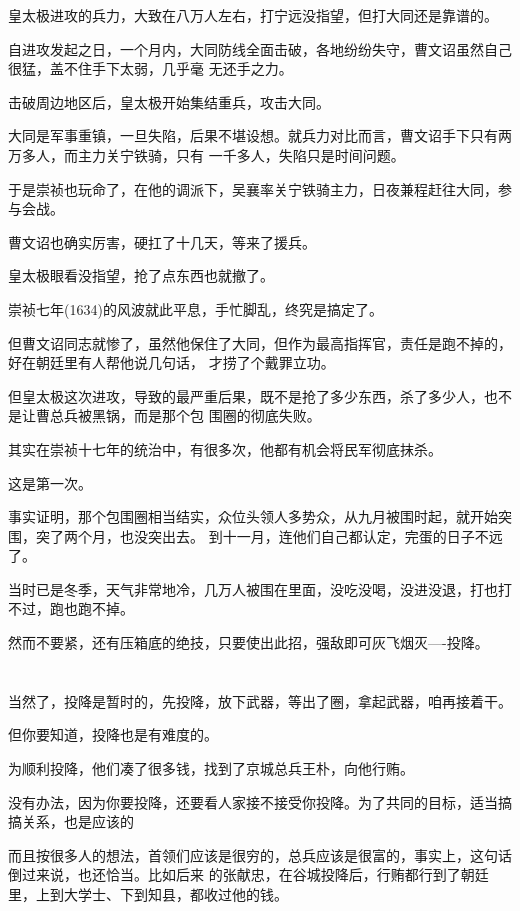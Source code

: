 \documentclass[11pt,a4paper,onecolumn]{article}
\begin{document}
皇太极进攻的兵力，大致在八万人左右，打宁远没指望，但打大同还是靠谱的。

自进攻发起之日，一个月内，大同防线全面击破，各地纷纷失守，曹文诏虽然自己很猛，盖不住手下太弱，几乎毫
无还手之力。

击破周边地区后，皇太极开始集结重兵，攻击大同。

大同是军事重镇，一旦失陷，后果不堪设想。就兵力对比而言，曹文诏手下只有两万多人，而主力关宁铁骑，只有
一千多人，失陷只是时间问题。

于是崇祯也玩命了，在他的调派下，吴襄率关宁铁骑主力，日夜兼程赶往大同，参与会战。

曹文诏也确实厉害，硬扛了十几天，等来了援兵。

皇太极眼看没指望，抢了点东西也就撤了。

崇祯七年(1634)的风波就此平息，手忙脚乱，终究是搞定了。

但曹文诏同志就惨了，虽然他保住了大同，但作为最高指挥官，责任是跑不掉的，好在朝廷里有人帮他说几句话，
才捞了个戴罪立功。

但皇太极这次进攻，导致的最严重后果，既不是抢了多少东西，杀了多少人，也不是让曹总兵被黑锅，而是那个包
围圈的彻底失败。

其实在崇祯十七年的统治中，有很多次，他都有机会将民军彻底抹杀。

这是第一次。

事实证明，那个包围圈相当结实，众位头领人多势众，从九月被围时起，就开始突围，突了两个月，也没突出去。
到十一月，连他们自己都认定，完蛋的日子不远了。

当时已是冬季，天气非常地冷，几万人被围在里面，没吃没喝，没进没退，打也打不过，跑也跑不掉。

然而不要紧，还有压箱底的绝技，只要使出此招，强敌即可灰飞烟灭----投降。

\section[\thesection]{}

当然了，投降是暂时的，先投降，放下武器，等出了圈，拿起武器，咱再接着干。

但你要知道，投降也是有难度的。

为顺利投降，他们凑了很多钱，找到了京城总兵王朴，向他行贿。

没有办法，因为你要投降，还要看人家接不接受你投降。为了共同的目标，适当搞搞关系，也是应该的

而且按很多人的想法，首领们应该是很穷的，总兵应该是很富的，事实上，这句话倒过来说，也还恰当。比如后来
的张献忠，在谷城投降后，行贿都行到了朝廷里，上到大学士、下到知县，都收过他的钱。
\end{document}
